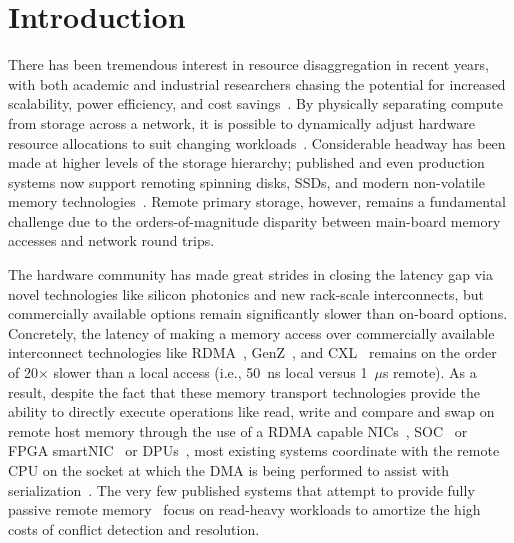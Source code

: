 \section{Introduction}

There has been tremendous interest in resource disaggregation in recent years,
with both academic and industrial researchers chasing the potential for
increased scalability, power efficiency, and cost
savings~\cite{fastswap,rethinking,the-machine,requirements,clio-arxiv,leap,zombieland,storm,aifm,legoos,supernic}.
By physically separating compute from storage across a network, it is possible
to dynamically adjust hardware resource allocations to suit changing
workloads~\cite{fastswap}.  Considerable headway has been made at higher levels
of the storage hierarchy; published and even production systems now support
remoting spinning disks, SSDs, and modern non-volatile memory
technologies~\cite{decible}.  Remote primary storage, however, remains a
fundamental challenge due to the orders-of-magnitude disparity between
main-board memory accesses and network round trips.



The hardware community has made great strides in closing the latency
gap via novel technologies like silicon photonics and new rack-scale
interconnects, but commercially available options remain significantly
slower than on-board options.  Concretely, the latency of making a
memory access over commercially available interconnect technologies
like RDMA~\cite{infiniband-spec}, GenZ~\cite{genz}, and CXL~\cite{cxl}
remains on the order of 20$\times$ slower than a local access (i.e.,
50~ns local versus 1~$\mu$s remote).  As a result, despite the fact
that these memory transport technologies provide the ability to
directly execute operations like read, write and compare and swap on
remote host memory through the use of a RDMA capable
NICs~\cite{connectx}, SOC~\cite{cavium} or FPGA
smartNIC~\cite{corundum,kv-direct} or DPUs~\cite{fungible}, most
existing systems coordinate with the remote CPU on the socket at which
the DMA is being performed to assist with
serialization~\cite{cliquemap,erpc,herd,sonuma,storm}.  The very few
published systems that attempt to provide fully passive remote
memory~\cite{reigons,clover} focus on read-heavy workloads to
amortize the high costs of conflict detection and resolution.

